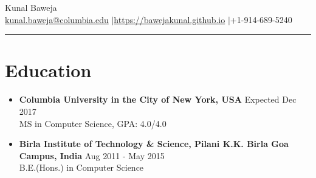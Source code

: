 \documentclass{article}
\def\name{Kunal Baweja}
\begin{document}
\begin{center}
{\huge \name}\\
\href{mailto:kunal.baweja@columbia.edu}{kunal.baweja@columbia.edu} $|$\hspace{3pt}\href{https://bawejakunal.github.io}{https://bawejakunal.github.io} $|$\hspace{3pt}+1-914-689-5240
\end{center}

\hrule
\vspace{5pt}

\vspace{-1mm}
\section*{Education}
\begin{itemize}

    \item \textbf{Columbia University in the City of New York, USA} {\hfill Expected Dec 2017}\\
    MS in Computer Science, GPA: 4.0/4.0
    
    \item \textbf{Birla Institute of Technology \& Science, Pilani K.K. Birla Goa Campus, India} {\hfill Aug 2011 - May 2015}\\
    B.E.(Hons.) in Computer Science

\end{itemize}

\vspace{-2mm}
\end{document}
